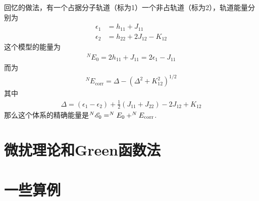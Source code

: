 回忆的做法，有一个占据分子轨道（标为1）一个非占轨道（标为2），轨道能量分别为
\begin{subequations}
	\begin{align}
	\epsilon_1 & = h_{11} + J_{11}\\
	\epsilon_2 & = h_{22} + 2J_{12} - K_{12}
	\end{align}
\end{subequations}
这个模型的能量为
\begin{align}
^NE_0 = 2h_{11} + J_{11} = 2\epsilon_1 - J_{11}
\end{align}
而为
\begin{align}
^NE_\mathrm{corr} = \Delta - (\Delta^2 + K_{12}^2)^{1/2}
\end{align}
其中
\begin{align}
\Delta = (\epsilon_1 - \epsilon_2) + \frac{1}{2}(J_{11} + J_{22}) - 2J_{12} + K_{12}
\end{align}
那么这个体系的精确能量是$^N\mathscr{E}_0 = ^NE_0 + ^NE_\mathrm{corr}$.
\section{微扰理论和Green函数法}
\section{一些算例}
\theendnotes